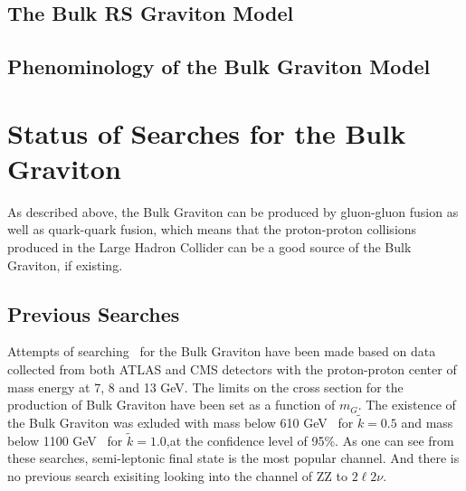 \subsection{The Bulk RS Graviton Model}

\subsection{Phenominology of the Bulk Graviton Model}

\section{Status of Searches for the Bulk Graviton}
As described above, the Bulk Graviton can be produced by gluon-gluon fusion as well as quark-quark fusion, which means that the proton-proton collisions produced in the Large Hadron Collider can be a good source of the Bulk Graviton, if existing. 
\subsection{Previous Searches}
Attempts of searching~\cite{Aad:2012nev,Aad:2013wxa,Aad:2014xka,Chatrchyan:2012baa,Khachatryan:2014gha,Aaboud:2016okv} for the Bulk Graviton have been made based on data collected from both ATLAS and CMS detectors with the proton-proton center of mass energy at 7, 8 and 13 GeV. The limits on the cross section for the production of Bulk Graviton have been set as a function of $m_{G}$. The existence of the Bulk Graviton was exluded with mass below 610 GeV~\cite{Chatrchyan:2012baa} for $\tilde{k}=0.5$ and mass below 1100 GeV~\cite{Aaboud:2016okv} for $\tilde{k}=1.0$,at the confidence level of 95\%. As one can see from these searches, semi-leptonic final state is the most popular channel. And there is no previous search exisiting looking into the channel of ZZ to $2\ell 2\nu$.
